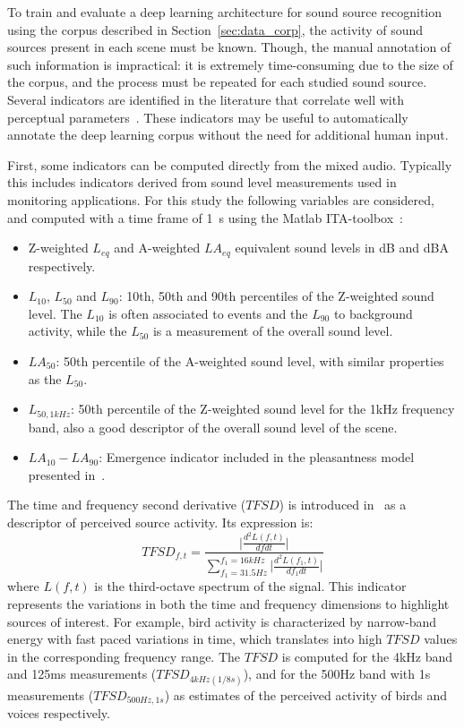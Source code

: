 \documentclass[twocolumn]{article}
\begin{document}
To train and evaluate a deep learning architecture for sound source recognition using the corpus described in Section~\ref{sec:data_corp}, the activity of sound sources present in each scene must be known. Though, the manual annotation of such information is impractical: it is extremely time-consuming due to the size of the corpus, and the process must be repeated for each studied sound source. Several indicators are identified in the literature that correlate well with perceptual parameters~\cite{aumond2017, gontier2018, ricciardi2014}. These indicators may be useful to automatically annotate the deep learning corpus without the need for additional human input.

First, some indicators can be computed directly from the mixed audio. Typically this includes indicators derived from sound level measurements used in monitoring applications. For this study the following variables are considered, and computed with a time frame of 1~s using the Matlab ITA-toolbox~\cite{itatoolbox2017}:
\begin{itemize}
\item Z-weighted $L_{eq}$ and A-weighted $LA_{eq}$ equivalent sound levels in dB and dBA respectively.
\item $L_{10}$, $L_{50}$ and $L_{90}$: 10th, 50th and 90th percentiles of the Z-weighted sound level. The $L_{10}$ is often associated to events and the $L_{90}$ to background activity, while the $L_{50}$ is a measurement of the overall sound level.
\item $LA_{50}$: 50th percentile of the A-weighted sound level, with similar properties as the $L_{50}$.
\item $L_{50, 1kHz}$: 50th percentile of the Z-weighted sound level for the 1kHz frequency band, also a good descriptor of the overall sound level of the scene.
\item $LA_{10}-LA_{90}$: Emergence indicator included in the pleasantness model presented in~\cite{ricciardi2014}.
\end{itemize}
The time and frequency second derivative ($TFSD$) is introduced in~\cite{aumond2017} as a descriptor of perceived source activity. Its expression is:
\begin{equation}
TFSD_{f, t} = \frac{\lvert\frac{d^2L(f, t)}{dfdt}\rvert}{\sum_{f_1=31.5Hz}^{f_1=16kHz}\lvert\frac{d^2L(f_1, t)}{df_1dt}\rvert}
\end{equation}
where $L(f, t)$ is the third-octave spectrum of the signal. This indicator represents the variations in both the time and frequency dimensions to highlight sources of interest. For example, bird activity is characterized by narrow-band energy with fast paced variations in time, which translates into high $TFSD$ values in the corresponding frequency range. The $TFSD$ is computed for the 4kHz band and 125ms measurements ($TFSD_{4kHz(1/8s)}$), and for the 500Hz band with 1s measurements ($TFSD_{500Hz, 1s}$) as estimates of the perceived activity of birds and voices respectively.
\end{document}
